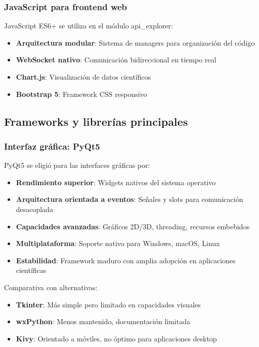 \subsubsection{JavaScript para frontend web}
JavaScript ES6+ se utiliza en el módulo api\_explorer:

\begin{itemize}
    \item \textbf{Arquitectura modular}: Sistema de managers para organización del código
    \item \textbf{WebSocket nativo}: Comunicación bidireccional en tiempo real
    \item \textbf{Chart.js}: Visualización de datos científicos
    \item \textbf{Bootstrap 5}: Framework CSS responsivo
\end{itemize}

\subsection{Frameworks y librerías principales}
\label{subsec:frameworks_principales}

\subsubsection{Interfaz gráfica: PyQt5}
PyQt5 se eligió para las interfaces gráficas por:

\begin{itemize}
    \item \textbf{Rendimiento superior}: Widgets nativos del sistema operativo
    \item \textbf{Arquitectura orientada a eventos}: Señales y slots para comunicación desacoplada
    \item \textbf{Capacidades avanzadas}: Gráficos 2D/3D, threading, recursos embebidos
    \item \textbf{Multiplataforma}: Soporte nativo para Windows, macOS, Linux
    \item \textbf{Estabilidad}: Framework maduro con amplia adopción en aplicaciones científicas
\end{itemize}

Comparativa con alternativas:
\begin{itemize}
    \item \textbf{Tkinter}: Más simple pero limitado en capacidades visuales
    \item \textbf{wxPython}: Menos mantenido, documentación limitada
    \item \textbf{Kivy}: Orientado a móviles, no óptimo para aplicaciones desktop
\end{itemize}

